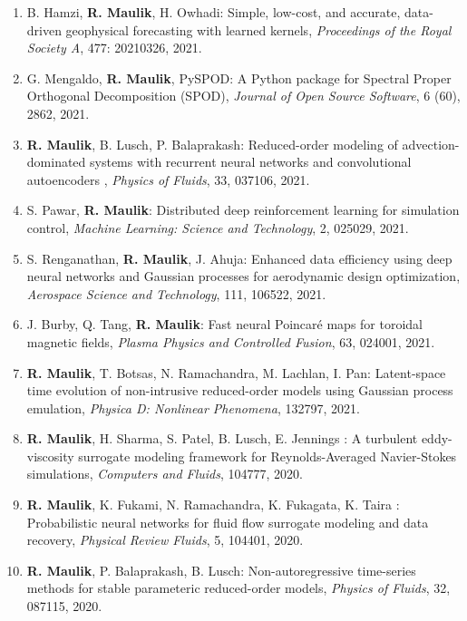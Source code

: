 \documentclass[letterpaper]{article}
\begin{document}
\begin{enumerate}
\item B. Hamzi, \textbf{R. Maulik}, H. Owhadi: Simple, low-cost, and accurate, data-driven geophysical forecasting with learned kernels, {\it Proceedings of the Royal Society A}, 477: 20210326, 2021.

\item G. Mengaldo, \textbf{R. Maulik}, PySPOD: A Python package for Spectral Proper Orthogonal Decomposition (SPOD), {\it Journal of Open Source Software}, 6 (60), 2862, 2021.

\item \textbf{R. Maulik}, B. Lusch, P. Balaprakash: Reduced-order modeling of advection-dominated systems with recurrent neural networks and convolutional autoencoders , {\it Physics of Fluids}, 33, 037106, 2021.

\item S. Pawar, \textbf{R. Maulik}: Distributed deep reinforcement learning for simulation control, {\it Machine Learning: Science and Technology}, 2, 025029, 2021.

\item S. Renganathan, \textbf{R. Maulik}, J. Ahuja: Enhanced data efficiency using deep neural networks and Gaussian processes for aerodynamic design optimization, {\it Aerospace Science and Technology}, 111, 106522, 2021.

\item J. Burby, Q. Tang, \textbf{R. Maulik}: Fast neural Poincar\'{e} maps for toroidal magnetic fields, {\it Plasma Physics and Controlled Fusion}, 63, 024001, 2021.

\item \textbf{R. Maulik}, T. Botsas, N. Ramachandra, M. Lachlan, I. Pan: Latent-space time evolution of non-intrusive reduced-order models using Gaussian process emulation, {\it Physica D: Nonlinear Phenomena}, 132797, 2021. 

\item \textbf{R. Maulik}, H. Sharma, S. Patel, B. Lusch, E. Jennings : A turbulent eddy-viscosity surrogate modeling framework for Reynolds-Averaged Navier-Stokes simulations, {\it Computers and Fluids}, 104777, 2020. 

\item \textbf{R. Maulik}, K. Fukami, N. Ramachandra, K. Fukagata, K. Taira : Probabilistic neural networks for fluid flow surrogate modeling and data recovery, {\it Physical Review Fluids}, 5, 104401, 2020. 

\item \textbf{R. Maulik}, P. Balaprakash, B. Lusch: Non-autoregressive time-series methods for stable parameteric reduced-order models, {\it Physics of Fluids}, 32, 087115, 2020.


\end{enumerate}
\end{document}
